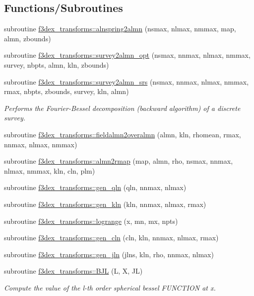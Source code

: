 \subsection*{Functions/Subroutines}
\begin{DoxyCompactItemize}
\item 
subroutine \hyperlink{namespacef3dex__transforms_aef309274871cf8eb0405b63f14ab26a2}{f3dex\_\-transforms::alnspring2almn} (nsmax, nlmax, nmmax, map, almn, zbounds)
\item 
subroutine \hyperlink{namespacef3dex__transforms_aa03041ae9480a0e4abc522b846a40cc8}{f3dex\_\-transforms::survey2almn\_\-opt} (nsmax, nnmax, nlmax, nmmax, survey, nbpts, almn, kln, zbounds)
\item 
subroutine \hyperlink{namespacef3dex__transforms_ae19f381573ccd64c64102bbd4181483f}{f3dex\_\-transforms::survey2almn\_\-srs} (nsmax, nnmax, nlmax, nmmax, rmax, nbpts, zbounds, survey, kln, almn)
\begin{DoxyCompactList}\small\item\em Performs the Fourier-\/Bessel decomposition (backward algorithm) of a discrete survey. \end{DoxyCompactList}\item 
subroutine \hyperlink{namespacef3dex__transforms_a4675d50d585b89b97772a0fa7dde4c5f}{f3dex\_\-transforms::fieldalmn2overalmn} (almn, kln, rhomean, rmax, nnmax, nlmax, nmmax)
\item 
subroutine \hyperlink{namespacef3dex__transforms_a3e792eb35f030b601d9262ac031cfdb9}{f3dex\_\-transforms::almn2rmap} (map, almn, rho, nsmax, nnmax, nlmax, nmmax, kln, cln, plm)
\item 
subroutine \hyperlink{namespacef3dex__transforms_a02b926f933d186f2c9d9ab6d478a1601}{f3dex\_\-transforms::gen\_\-qln} (qln, nnmax, nlmax)
\item 
subroutine \hyperlink{namespacef3dex__transforms_a4b80bc7cad52998fd0aff935a1695ee7}{f3dex\_\-transforms::gen\_\-kln} (kln, nnmax, nlmax, rmax)
\item 
subroutine \hyperlink{namespacef3dex__transforms_a2cd270ebc1186ae3872ab2e0068cff9d}{f3dex\_\-transforms::logrange} (x, mn, mx, npts)
\item 
subroutine \hyperlink{namespacef3dex__transforms_aa6cd797c56b97503bf2d52131f6e5554}{f3dex\_\-transforms::gen\_\-cln} (cln, kln, nnmax, nlmax, rmax)
\item 
subroutine \hyperlink{namespacef3dex__transforms_ad1ab102a8307876c7af8bd6868ea7ef2}{f3dex\_\-transforms::gen\_\-jln} (jlns, kln, rho, nnmax, nlmax)
\item 
subroutine \hyperlink{namespacef3dex__transforms_a9b68481c890d75c3e3f4cbd4a7109830}{f3dex\_\-transforms::BJL} (L, X, JL)
\begin{DoxyCompactList}\small\item\em Compute the value of the l-\/th order spherical bessel FUNCTION at x. \end{DoxyCompactList}\end{DoxyCompactItemize}
